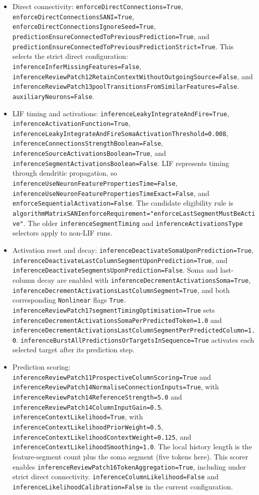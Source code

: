 \begin{itemize}
	\item Direct connectivity: \texttt{enforceDirectConnections=True}, \texttt{enforceDirectConnectionsSANI=True}, \texttt{enforceDirectConnectionsIgnoreSeed=True}, \texttt{predictionEnsureConnectedToPreviousPrediction=True}, and \texttt{predictionEnsureConnectedToPreviousPredictionStrict=True}. This selects the strict direct configuration: \texttt{inferenceInferMissingFeatures=False}, \texttt{inferenceReviewPatch12RetainContextWithoutOutgoingSource=False}, and \texttt{inferenceReviewPatch13poolTransitionsFromSimilarFeatures=False}. \texttt{auxiliaryNeurons=False}.
	\item LIF timing and activations: \texttt{inferenceLeakyIntegrateAndFire=True}, \texttt{inferenceActivationFunction=True}, \texttt{inferenceLeakyIntegrateAndFireSomaActivationThreshold=0.008}, \texttt{inferenceConnectionsStrengthBoolean=False}, \texttt{inferenceSourceActivationsBoolean=True}, and \texttt{inferenceSegmentActivationsBoolean=False}. LIF represents timing through dendritic propagation, so \texttt{inferenceUseNeuronFeaturePropertiesTime=False}, \texttt{inferenceUseNeuronFeaturePropertiesTimeExact=False}, and \texttt{enforceSequentialActivation=False}. The candidate eligibility rule is \texttt{algorithmMatrixSANIenforceRequirement="enforceLastSegmentMustBeActive"}. The older \texttt{inferenceSegmentTiming} and \texttt{inferenceActivationsType} selectors apply to non-LIF runs.
	\item Activation reset and decay: \texttt{inferenceDeactivateSomaUponPrediction=True}, \texttt{inferenceDeactivateLastColumnSegmentUponPrediction=True}, and \texttt{inferenceDeactivateSegmentsUponPrediction=False}. Soma and last-column decay are enabled with \texttt{inferenceDecrementActivationsSoma=True}, \texttt{inferenceDecrementActivationsLastColumnSegment=True}, and both corresponding \texttt{Nonlinear} flags \texttt{True}. \texttt{inferenceReviewPatch17segmentTimingOptimisation=True} sets \texttt{inferenceDecrementActivationsSomaPerPredictedToken=1.0} and \texttt{inferenceDecrementActivationsLastColumnSegmentPerPredictedColumn=1.0}. \texttt{inferenceBurstAllPredictionsOrTargetsInSequence=True} activates each selected target after its prediction step.
	\item Prediction scoring: \texttt{inferenceReviewPatch11ProspectiveColumnScoring=True} and \texttt{inferenceReviewPatch14NormaliseConnectionInputs=True}, with \texttt{inferenceReviewPatch14ReferenceStrength=5.0} and \texttt{inferenceReviewPatch14ColumnInputGain=0.5}. \texttt{inferenceContextLikelihood=True}, with \texttt{inferenceContextLikelihoodPriorWeight=0.5}, \texttt{inferenceContextLikelihoodContextWeight=0.125}, and \texttt{inferenceContextLikelihoodSmoothing=1.0}. The local history length is the feature-segment count plus the soma segment (five tokens here). This scorer enables \texttt{inferenceReviewPatch16TokenAggregation=True}, including under strict direct connectivity. \texttt{inferenceColumnLikelihood=False} and \texttt{inferenceLikelihoodCalibration=False} in the current configuration.

\end{itemize}
